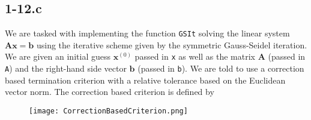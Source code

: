 \documentclass{article}
\begin{document}
\subsection*{1-12.c}
We are tasked with implementing the function \verb|GSIt| solving the linear system $\mathbf{A}\mathbf{x} = \mathbf{b}$ using the iterative scheme given by the symmetric Gauss-Seidel iteration. We are given an initial guess $\mathbf{x}^{\left(0\right)}$ passed in \verb|x| as well as the matrix $\mathbf{A}$ (passed in \verb|A|) and the right-hand side vector $\mathbf{b}$ (passed in \verb|b|). We are told to use a correction based termination criterion with a relative tolerance based on the Euclidean vector norm. The correction based criterion is defined by

\begin{figure}[!hbt]
    \centering
\texttt{[image: CorrectionBasedCriterion.png]}
\end{figure}
\end{document}
